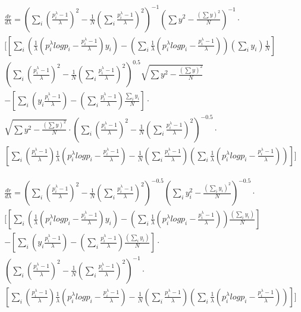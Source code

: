 \begin{multline}
\frac{dr}{d\lambda}=
\left(\sum_i\left(\frac{p_i^{\lambda}-1}{\lambda}\right)^2-\frac{1}{N}\left(\sum_i \frac{p_i^{\lambda}-1}{\lambda}\right)^2  \right)^{-1}
\left(\sum{y^2}-\frac{\left(\sum{y}\right)^2}{N}\right)^{-1}\cdot  \\
[
\left[
\sum_i\left(\frac{1}{\lambda}\left(p_i^{\lambda}log{p_i}-\frac{p_i^{\lambda}-1}{\lambda}\right)y_i\right) -
\left(\sum_i\frac{1}{\lambda}\left(p_i^{\lambda}log{p_i}-\frac{p_i^{\lambda}-1}{\lambda}\right)\right)\left(\sum_iy_i\right)\frac{1}{N}
\right]  \\
\left(\sum_i\left(\frac{p_i^{\lambda}-1}{\lambda}\right)^2-\frac{1}{N}\left(\sum_i \frac{p_i^{\lambda}-1}{\lambda}\right)^2  \right)^{0.5}
\sqrt{\sum{y^2}-\frac{\left(\sum{y}\right)^2}{N}}  \\
-
\left[\sum_i \left(y_i\frac{p_i^{\lambda}-1}{\lambda}\right) - \left(\sum_i\frac{p_i^{\lambda}-1}{\lambda}\right)\frac{\sum_iy_i}{N}\right]\cdot\\
\sqrt{\sum{y^2}-\frac{\left(\sum{y}\right)^2}{N}}\cdot
\left(\sum_i\left(\frac{p_i^{\lambda}-1}{\lambda}\right)^2-\frac{1}{N}\left(\sum_i \frac{p_i^{\lambda}-1}{\lambda}\right)^2  \right)^{-0.5}
\cdot\\
\left[
\sum_i\left(\frac{p_i^{\lambda}-1}{\lambda} \right)\frac{1}{\lambda}\left(p_i^{\lambda}log{p_i}-\frac{p_i^{\lambda}-1}{\lambda}\right)
-\frac{1}{N}\left(\sum_i \frac{p_i^{\lambda}-1}{\lambda}\right) \left(\sum_i \frac{1}{\lambda}\left(p_i^{\lambda}log{p_i}-\frac{p_i^{\lambda}-1}{\lambda}\right) \right)
\right]
]
\end{multline}

\begin{multline}
\frac{dr}{d\lambda}=
\left(\sum_i\left(\frac{p_i^{\lambda}-1}{\lambda}\right)^2-\frac{1}{N}\left(\sum_i \frac{p_i^{\lambda}-1}{\lambda}\right)^2  \right)^{-0.5}
\left(\sum_i{y_i^2}-\frac{\left(\sum_i{y_i}\right)^2}{N}\right)^{-0.5}\cdot  \\
[
\left[
\sum_i\left(\frac{1}{\lambda}\left(p_i^{\lambda}log{p_i}-\frac{p_i^{\lambda}-1}{\lambda}\right)y_i\right) -
\left(\sum_i\frac{1}{\lambda}\left(p_i^{\lambda}log{p_i}-\frac{p_i^{\lambda}-1}{\lambda}\right)\right)\frac{\left(\sum_iy_i\right)}{N}
\right]  \\
-
\left[\sum_i \left(y_i\frac{p_i^{\lambda}-1}{\lambda}\right) - \left(\sum_i\frac{p_i^{\lambda}-1}{\lambda}\right)\frac{\left(\sum_iy_i\right)}{N}\right]\cdot\\
\left(\sum_i\left(\frac{p_i^{\lambda}-1}{\lambda}\right)^2-\frac{1}{N}\left(\sum_i \frac{p_i^{\lambda}-1}{\lambda}\right)^2  \right)^{-1}
\cdot\\
\left[
\sum_i\left(\frac{p_i^{\lambda}-1}{\lambda} \right)\frac{1}{\lambda}\left(p_i^{\lambda}log{p_i}-\frac{p_i^{\lambda}-1}{\lambda}\right)
-\frac{1}{N}\left(\sum_i \frac{p_i^{\lambda}-1}{\lambda}\right) \left(\sum_i \frac{1}{\lambda}\left(p_i^{\lambda}log{p_i}-\frac{p_i^{\lambda}-1}{\lambda}\right) \right)
\right]
]
\end{multline}

